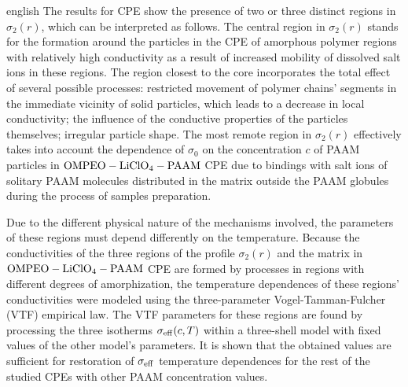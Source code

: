 \begin{otherlanguage*}{english}
The results for CPE show the presence of two or three distinct regions in $ \sigma_2 (r) $, which can be interpreted as follows. The central region in $ \sigma_2 (r) $ stands for the formation around the particles in the CPE of amorphous polymer regions with relatively high conductivity as a result of increased mobility of dissolved salt ions in these regions. The region closest to the core incorporates the total effect of several possible processes: restricted movement of polymer chains' segments in the immediate vicinity of solid particles, which leads to a decrease in local conductivity; the influence of the conductive properties of the particles themselves; irregular particle shape. The most remote region in $ \sigma_2 (r) $ effectively takes into account the dependence of $ \sigma_0 $ on the concentration $ c $ of PAAM particles in $ \rm OMPEO-LiClO_4-PAAM $ CPE due to bindings with salt ions of solitary PAAM molecules distributed in the matrix outside the PAAM globules during the process of samples preparation.

Due to the different physical nature of the mechanisms involved, the parameters of these regions must depend differently on the temperature. Because the conductivities of the three regions of the profile $ \sigma_2 (r) $ and the matrix in $ \rm OMPEO-LiClO_4-PAAM $  CPE are formed by processes in regions with different degrees of amorphization, the temperature dependences of these regions' conductivities were modeled using the three-parameter Vogel-Tamman-Fulcher  (VTF) empirical law. The VTF parameters for these regions are found by processing the three isotherms $ \sigma_ {\rm eff} (c, T) $ within a three-shell model with fixed values  of the other model's parameters. It is shown that the obtained values are sufficient for restoration of $ \sigma_ {\rm eff} $ temperature dependences for the rest of the studied CPEs with other  PAAM concentration values.


\end{otherlanguage*}
